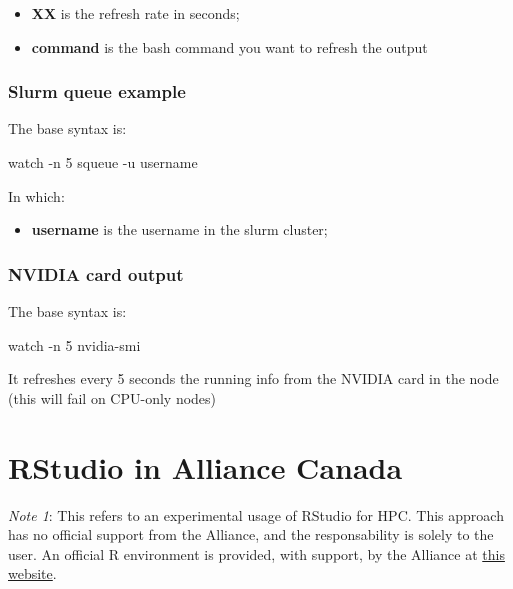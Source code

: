 \documentclass[
]{book}
\newenvironment{Shaded}{\begin{snugshade}}{\end{snugshade}}
\newcommand{\AttributeTok}[1]{\textcolor[rgb]{0.13,0.29,0.53}{#1}}
\newcommand{\ExtensionTok}[1]{#1}
\newcommand{\NormalTok}[1]{#1}
\providecommand{\tightlist}{%
  \setlength{\itemsep}{0pt}\setlength{\parskip}{0pt}}
\begin{document}
\begin{itemize}
\tightlist
\item
  \textbf{XX} is the refresh rate in seconds;
\item
  \textbf{command} is the bash command you want to refresh the output
\end{itemize}

\hypertarget{slurm-queue-example}{%
\subsection{Slurm queue example}\label{slurm-queue-example}}

The base syntax is:

\begin{Shaded}
\begin{Highlighting}[]
\ExtensionTok{watch} \AttributeTok{{-}n}\NormalTok{ 5 squeue }\AttributeTok{{-}u}\NormalTok{ username}
\end{Highlighting}
\end{Shaded}

In which:

\begin{itemize}
\tightlist
\item
  \textbf{username} is the username in the slurm cluster;
\end{itemize}

\hypertarget{nvidia-card-output}{%
\subsection{NVIDIA card output}\label{nvidia-card-output}}

The base syntax is:

\begin{Shaded}
\begin{Highlighting}[]
\ExtensionTok{watch} \AttributeTok{{-}n}\NormalTok{ 5 nvidia{-}smi}
\end{Highlighting}
\end{Shaded}

It refreshes every 5 seconds the running info from the NVIDIA card in the node (this will fail on CPU-only nodes)

\hypertarget{rstudio-in-alliance-canada}{%
\chapter{RStudio in Alliance Canada}\label{rstudio-in-alliance-canada}}

\emph{Note 1}: This refers to an experimental usage of RStudio for HPC. This approach
has no official support from the Alliance, and the responsability is solely to
the user. An official R environment is provided, with support, by the Alliance at
\href{https://docs.alliancecan.ca/wiki/Technical_documentation}{this website}.
\end{document}
